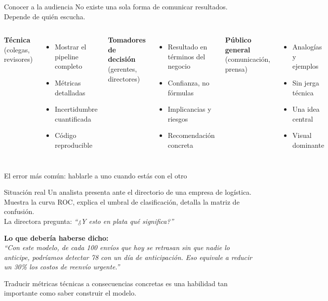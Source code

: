 \documentclass[aspectratio=169]{beamer}
\begin{document}
\begin{frame}{Conocer a la audiencia}
  No existe una sola forma de comunicar resultados. Depende de quién escucha.

  \bigskip
  \begin{columns}
      \textbf{Técnica}\\
      (colegas, revisores)
      \begin{itemize}
        \item Mostrar el pipeline completo
        \item Métricas detalladas
        \item Incertidumbre cuantificada
        \item Código reproducible
      \end{itemize}
      \textbf{Tomadores de decisión}\\
      (gerentes, directores)
      \begin{itemize}
        \item Resultado en términos del negocio
        \item Confianza, no fórmulas
        \item Implicancias y riesgos
        \item Recomendación concreta
      \end{itemize}
      \textbf{Público general}\\
      (comunicación, prensa)
      \begin{itemize}
        \item Analogías y ejemplos
        \item Sin jerga técnica
        \item Una idea central
        \item Visual dominante
      \end{itemize}
  \end{columns}
\end{frame}

\begin{frame}{El error más común: hablarle a uno cuando estás con el otro}
  \begin{exampleblock}{Situación real}
    Un analista presenta ante el directorio de una empresa de logística. Muestra la curva ROC, explica el umbral de clasificación, detalla la matriz de confusión.\\
    \bigskip
    La directora pregunta: \textit{``¿Y esto en plata qué significa?''}
  \end{exampleblock}

  \bigskip
  \textbf{Lo que debería haberse dicho:}\\
  \textit{``Con este modelo, de cada 100 envíos que hoy se retrasan sin que nadie lo anticipe, podríamos detectar 78 con un día de anticipación. Eso equivale a reducir un 30\% los costos de reenvío urgente.''}

  \bigskip
  Traducir métricas técnicas a consecuencias concretas es una habilidad tan importante como saber construir el modelo.
\end{frame}
\end{document}
